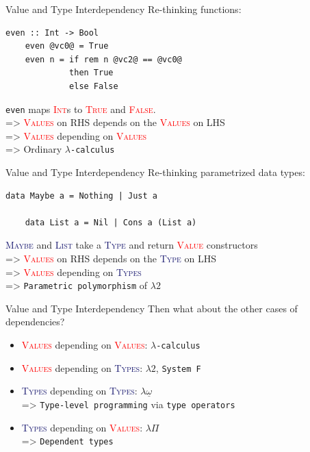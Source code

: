 \documentclass[xcolor={usenames,dvipsnames}]{beamer}
\newcommand{\htycon}[1]{\textcolor{MidnightBlue}{\textsc{#1}}}
\newcommand{\hvalcon}[1]{\textcolor{Red}{\textsc{#1}}}
\begin{document}
\begin{frame}[fragile]{Value and Type Interdependency}
  Re-thinking functions:
  \begin{lstlisting}[style=hask]
    even :: Int -> Bool
    even @vc0@ = True
    even n = if rem n @vc2@ == @vc0@
             then True
             else False
  \end{lstlisting}

  \qquad \texttt{even} maps \hvalcon{Int}s to \hvalcon{True} and \hvalcon{False}.
  \ \\
  => \hvalcon{Values} on RHS depends on the \hvalcon{Values} on LHS
  \ \\
  => \hvalcon{Values} depending on \hvalcon{Values}
  \ \\
  => Ordinary \texttt{$\lambda$-calculus}
\end{frame}

\begin{frame}[fragile]{Value and Type Interdependency}
  Re-thinking parametrized data types:
  \begin{lstlisting}[style=hask]
    data Maybe a = Nothing | Just a

    data List a = Nil | Cons a (List a)
  \end{lstlisting}

  \qquad \htycon{Maybe} and \htycon{List} take a \htycon{Type} and return \hvalcon{Value} constructors
  \ \\
  => \hvalcon{Values} on RHS depends on the \htycon{Type} on LHS
  \ \\
  => \hvalcon{Values} depending on \htycon{Types}
  \ \\
  => \texttt{Parametric polymorphism} of $\lambda2$

\end{frame}

\begin{frame}[fragile]{Value and Type Interdependency}
  Then what about the other cases of dependencies?
  \begin{itemize}
    \item \hvalcon{Values} depending on \hvalcon{Values}: \texttt{$\lambda$-calculus}
    \item \hvalcon{Values} depending on \htycon{Types}: $\lambda2$, \texttt{System F}
    \pause
    \item \htycon{Types} depending on \htycon{Types}: $\lambda\underline\omega$\\
      => \texttt{Type-level programming} via \texttt{type operators}
    \pause
    \item \htycon{Types} depending on \hvalcon{Values}: $\lambda\Pi$\\
      => \texttt{Dependent types}
  \end{itemize}
\end{frame}
\end{document}
